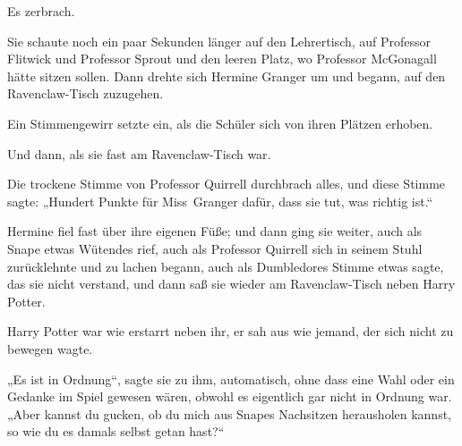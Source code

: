 Es zerbrach.

Sie schaute noch ein paar Sekunden länger auf den Lehrertisch, auf Professor Flitwick und Professor Sprout und den leeren Platz, wo Professor McGonagall hätte sitzen sollen. Dann drehte sich Hermine Granger um und begann, auf den Ravenclaw-Tisch zuzugehen.

Ein Stimmengewirr setzte ein, als die Schüler sich von ihren Plätzen erhoben.

Und dann, als sie fast am Ravenclaw-Tisch war.

Die trockene Stimme von Professor Quirrell durchbrach alles, und diese Stimme sagte: „Hundert Punkte für Miss~Granger dafür, dass sie tut, was richtig ist.“

Hermine fiel fast über ihre eigenen Füße; und dann ging sie weiter, auch als Snape etwas Wütendes rief, auch als Professor Quirrell sich in seinem Stuhl zurücklehnte und zu lachen begann, auch als Dumbledores Stimme etwas sagte, das sie nicht verstand, und dann saß sie wieder am Ravenclaw-Tisch neben Harry Potter.

Harry Potter war wie erstarrt neben ihr, er sah aus wie jemand, der sich nicht zu bewegen wagte.

„Es ist in Ordnung“, sagte sie zu ihm, automatisch, ohne dass eine Wahl oder ein Gedanke im Spiel gewesen wären, obwohl es eigentlich gar nicht in Ordnung war. „Aber kannst du gucken, ob du mich aus Snapes Nachsitzen herausholen kannst, so wie du es damals selbst getan hast?“


